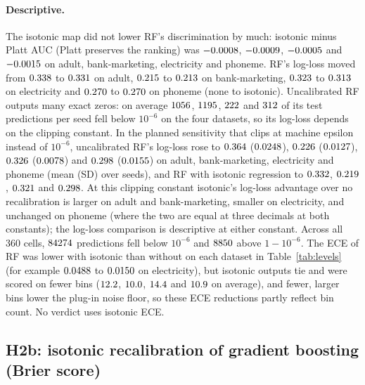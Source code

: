 \documentclass[11pt]{article}
\newcommand{\ds}[1]{\textsf{#1}}
\newcommand{\ad}{\ds{adult}}
\newcommand{\bm}{\ds{bank-marketing}}
\newcommand{\el}{\ds{electricity}}
\newcommand{\ph}{\ds{phoneme}}
\begin{document}
\paragraph{Descriptive.} The isotonic map did not lower RF's discrimination by much: isotonic
minus Platt AUC (Platt preserves the ranking) was $-0.0008$,
$-0.0009$, $-0.0005$ and $-0.0015$ on
\ad, \bm, \el{} and \ph. RF's log-loss moved from $0.338$ to
$0.331$ on \ad, $0.215$ to $0.213$ on \bm,
$0.323$ to $0.313$ on \el{} and $0.270$ to
$0.270$ on \ph{} (none to isotonic). Uncalibrated RF outputs many exact zeros:
on average $1056$, $1195$, $222$ and
$312$ of its test predictions per seed fell below $10^{-6}$ on the four
datasets, so its log-loss depends on the clipping constant. In the planned sensitivity that
clips at machine epsilon instead of $10^{-6}$, uncalibrated RF's log-loss rose to
$0.364$ ($0.0248$), $0.226$
($0.0127$), $0.326$ ($0.0078$) and
$0.298$ ($0.0155$) on \ad, \bm, \el{} and \ph{}
(mean (SD) over seeds), and RF with isotonic regression to $0.332$,
$0.219$, $0.321$ and $0.298$. At this
clipping constant isotonic's log-loss advantage over no recalibration is larger on \ad{} and
\bm, smaller on \el, and unchanged on \ph{} (where the two are equal at three decimals at both
constants); the log-loss comparison is descriptive at either constant. Across all 360 cells,
$84274$ predictions fell below $10^{-6}$ and $8850$ above $1-10^{-6}$. The
ECE of RF was lower with isotonic than without on each dataset in Table~\ref{tab:levels} (for
example $0.0488$ to $0.0150$ on \el), but isotonic outputs tie and were scored
on fewer bins ($12.2$, $10.0$, $14.4$ and
$10.9$ on average), and fewer, larger bins lower the plug-in noise floor, so
these ECE reductions partly reflect bin count. No verdict uses isotonic ECE.

\subsection{H2b: isotonic recalibration of gradient boosting (Brier score)}
\label{sec:h2b}
\end{document}
